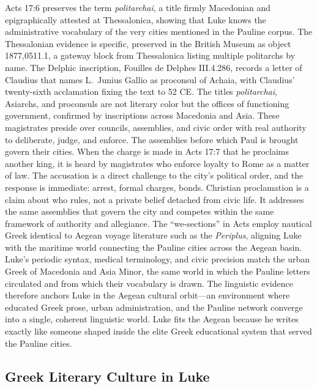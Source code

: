 Acts 17:6 preserves the term \textit{politarchai}, a title firmly Macedonian and epigraphically attested at Thessalonica, showing that Luke knows the administrative vocabulary of the very cities mentioned in the Pauline corpus.
The Thessalonian evidence is specific, preserved in the British Museum as object 1877,0511.1, a gateway block from Thessalonica listing multiple politarchs by name.
The Delphic inscription, Fouilles de Delphes III.4.286, records a letter of Claudius that names L.\ Junius Gallio as proconsul of Achaia, with Claudius' twenty-sixth acclamation fixing the text to 52 CE.
The titles \textit{politarchai}, Asiarchs, and proconsuls are not literary color but the offices of functioning government, confirmed by inscriptions across Macedonia and Asia.
These magistrates preside over councils, assemblies, and civic order with real authority to deliberate, judge, and enforce.
The assemblies before which Paul is brought govern their cities.
When the charge is made in Acts 17:7 that he proclaims another king, it is heard by magistrates who enforce loyalty to Rome as a matter of law.
The accusation is a direct challenge to the city's political order, and the response is immediate: arrest, formal charges, bonds.
Christian proclamation is a claim about who rules, not a private belief detached from civic life.
It addresses the same assemblies that govern the city and competes within the same framework of authority and allegiance.
The ``we-sections'' in Acts employ nautical Greek identical to Aegean voyage literature such as the \textit{Periplus}, aligning Luke with the maritime world connecting the Pauline cities across the Aegean basin.
Luke's periodic syntax, medical terminology, and civic precision match the urban Greek of Macedonia and Asia Minor, the same world in which the Pauline letters circulated and from which their vocabulary is drawn.
The linguistic evidence therefore anchors Luke in the Aegean cultural orbit---an environment where educated Greek prose, urban administration, and the Pauline network converge into a single, coherent linguistic world.
Luke fits the Aegean because he writes exactly like someone shaped inside the elite Greek educational system that served the Pauline cities.

\subsection{Greek Literary Culture in Luke}

